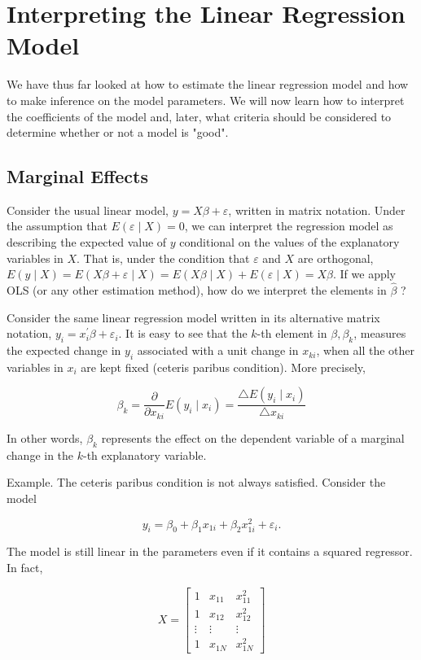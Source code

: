 \section{Interpreting the Linear Regression Model}
We have thus far looked at how to estimate the linear regression model and how to make inference on the model parameters. We will now learn how to interpret the coefficients of the model and, later, what criteria should be considered to determine whether or not a model is "good".

\subsection{Marginal Effects}
Consider the usual linear model, $y=X \beta+\varepsilon$, written in matrix notation. Under the assumption that $E(\varepsilon \mid X)=0$, we can interpret the regression model as describing the expected value of $y$ conditional on the values of the explanatory variables in $X$. That is, under the condition that $\varepsilon$ and $X$ are orthogonal, $E(y \mid X)=E(X \beta+\varepsilon \mid X)=E(X \beta \mid X)+E(\varepsilon \mid X)=X \beta$. If we apply OLS (or any other estimation method), how do we interpret the elements in $\widehat{\beta}$ ?

Consider the same linear regression model written in its alternative matrix notation, $y_{i}=x_{i}^{\prime} \beta+\varepsilon_{i}$. It is easy to see that the $k$-th element in $\beta, \beta_{k}$, measures the expected change in $y_{i}$ associated with a unit change in $x_{k i}$, when all the other variables in $x_{i}$ are kept fixed (ceteris paribus condition). More precisely,

$$
\beta_{k}=\frac{\partial}{\partial x_{k i}} E\left(y_{i} \mid x_{i}\right)=\frac{\triangle E\left(y_{i} \mid x_{i}\right)}{\triangle x_{k i}}
$$

In other words, $\beta_{k}$ represents the effect on the dependent variable of a marginal change in the $k$-th explanatory variable.

Example. The ceteris paribus condition is not always satisfied. Consider the model

$$
y_{i}=\beta_{0}+\beta_{1} x_{1 i}+\beta_{2} x_{1 i}^{2}+\varepsilon_{i} .
$$

The model is still linear in the parameters even if it contains a squared regressor. In fact,

$$
X=\left[\begin{array}{ccc}
1 & x_{11} & x_{11}^{2} \\
1 & x_{12} & x_{12}^{2} \\
\vdots & \vdots & \vdots \\
1 & x_{1 N} & x_{1 N}^{2}
\end{array}\right]
$$

